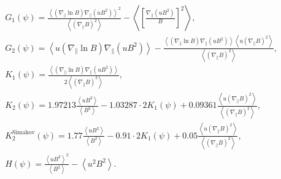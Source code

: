\documentclass[12pt]{revtex4}
\begin{document}
\begin{align}
\begin{split}
& {G}_1 \left(\psi\right) %
= \frac{\left\langle \left( {\nabla}_\| \ln {B}\right)  {\nabla}_\| \left({u} {B}^2\right)\right\rangle^2}{\left\langle \left( {\nabla}_\| {B}\right)^2\right\rangle} -
 \left\langle \left[\frac{ {\nabla}_\| \left({u} {B}^2\right)}{{B}}\right]^2\right\rangle,  \\
& {G}_2 \left(\psi\right) %
 = \left\langle {u} \left({\nabla}_\| \ln {B}\right) {\nabla}_\| \left({u} {B}^2\right) \right\rangle
 - \frac{\left\langle \left( {\nabla}_\| \ln {B}\right)  {\nabla}_\| \left({u} {B}^2\right)\right\rangle
 \left\langle {u} \left( {\nabla}_\| {B}\right)^2\right\rangle}{\left\langle \left( {\nabla}_\| {B}\right)^2\right\rangle},  \\
& {K}_1 \left(\psi\right) %
 = \frac{\left\langle \left( {\nabla}_\| \ln {B}\right)  {\nabla}_\| \left({u} {B}^2\right)\right\rangle}{2 \left\langle \left( {\nabla}_\| {B}\right)^2\right\rangle}, \\
& {K}_2 \left(\psi\right) %
 = 1.97213 \frac{\left\langle {u} {B}^2  \right\rangle}{\left\langle {B}^2  \right\rangle} - 1.03287 \cdot 2 {K}_1 \left(\psi\right)
 + 0.09361 \frac{
 \left\langle {u} \left( {\nabla}_\| {B}\right)^2\right\rangle}{\left\langle \left( {\nabla}_\| {B}\right)^2\right\rangle}, \\
&  {K}_{2}^{\mathrm{Simakov}} \left(\psi\right) %
  = 1.77 \frac{\left\langle {u} {B}^2  \right\rangle}{\left\langle {B}^2  \right\rangle} - 0.91 \cdot 2 {K}_1 \left(\psi\right)
 + 0.05 \frac{
 \left\langle {u} \left( {\nabla}_\| {B}\right)^2\right\rangle}{\left\langle \left( {\nabla}_\| {B}\right)^2\right\rangle}, \\
& {H} \left(\psi\right) %
 = \frac{\left\langle {u} {B}^2  \right\rangle^2}{\left\langle {B}^2  \right\rangle} - \left\langle {u}^2 {B}^2  \right\rangle.
\label{eq:PSregimeFunctions}
\end{split}
\end{align}


\end{document}
